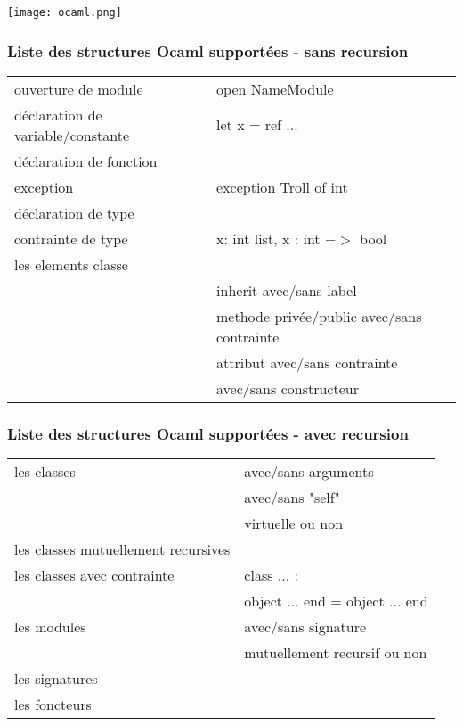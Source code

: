 \documentclass{beamer}
\begin{document}
\begin{frame}
    \texttt{[image: ocaml.png]}
\end{frame}


\begin{frame}
\frametitle{Liste des structures Ocaml supportées - sans recursion}
    \begin{tabular}{ll}
         ouverture de module & open NameModule\\
         \pause
         déclaration de variable/constante & let x = ref ... \\
         \pause
         déclaration de fonction & \\
         \pause
         exception & exception Troll of int\\
         \pause
         déclaration de type & \\
         \pause
         contrainte de type & x: int list, x : int $->$ bool\\
         \pause
         les elements classe & \\
         & inherit avec/sans label\\
         & methode privée/public avec/sans contrainte\\
         & attribut avec/sans contrainte\\
         & avec/sans constructeur\\
    \end{tabular}
\end{frame}

\begin{frame}
\frametitle{Liste des structures Ocaml supportées - avec recursion}
    \begin{tabular}{ll}
        les classes & avec/sans arguments\\
        & avec/sans "self"\\
        & virtuelle ou non\\
        \pause
        les classes mutuellement recursives & \\
        \pause
        les classes avec contrainte & class ... :\\
        & object ... end = object ... end\\

        les modules & avec/sans signature\\
        \pause
        & mutuellement recursif ou non\\
        les signatures & \\
        \pause
        les foncteurs & \\
    \end{tabular}
\end{frame}
\end{document}
